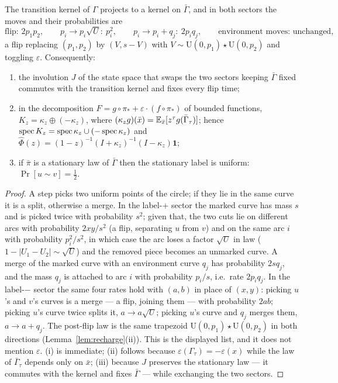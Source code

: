 \begin{lemma}\label{lem:autonomy}
The transition kernel of $\Gamma$ projects to a kernel on
$\bar\Gamma$, and in both sectors the moves and their probabilities are
\[
\text{flip: }2p_1p_2,\qquad
p_i\to p_i\sqrt U:\ p_i^2,\qquad
p_i\to p_i+q_j:\ 2p_iq_j,\qquad
\text{environment moves: unchanged,}
\]
a flip replacing $(p_1,p_2)$ by $(V,s-V)$ with
$V\sim\mathrm{U}(0,p_1)\star\mathrm{U}(0,p_2)$ and toggling
$\varepsilon$.  Consequently:
\begin{enumerate}[leftmargin=2em]
\item[(i)] the involution $J$ of the state space that swaps the two
sectors keeping $\bar\Gamma$ fixed commutes with the transition kernel
and fixes every flip time;
\item[(ii)] in the decomposition
$F=g\circ\pi_\ast+\varepsilon\cdot(f\circ\pi_\ast)$ of bounded
functions, $K_z=\kappa_z\oplus(-\kappa_z)$, where
$(\kappa_zg)(\bar x)=\mathbb{E}_{\bar x}[z^\tau g(\bar\Gamma_\tau)]$; hence
$\operatorname{spec} K_z=\operatorname{spec}\kappa_z\cup(-\operatorname{spec}\kappa_z)$ and
$\widehat\Phi(z)=(1-z)^{-1}(I+\kappa_z)^{-1}(I-\kappa_z)\mathbf 1$;
\item[(iii)] if $\bar\pi$ is a stationary law of $\bar\Gamma$ then the
stationary label is uniform: $\Pr[u\sim v]=\tfrac12$.
\end{enumerate}
\end{lemma}

\begin{proof}
A step picks two uniform points of the circle; if they lie in the same
curve it is a split, otherwise a merge.  In the label-$+$ sector the
marked curve has mass $s$ and is picked twice with probability $s^2$;
given that, the two cuts lie on different arcs with probability
$2xy/s^2$ (a flip, separating $u$ from $v$) and on the same arc $i$
with probability $p_i^2/s^2$, in which case the arc loses a factor
$\sqrt U$ in law ($1-|U_1-U_2|\sim\sqrt U$) and the removed piece
becomes an unmarked curve.  A merge of the marked curve with an
environment curve $q_j$ has probability $2sq_j$, and the mass $q_j$ is
attached to arc $i$ with probability $p_i/s$, i.e.\ rate $2p_iq_j$.  In
the label-$-$ sector the same four rates hold with $(a,b)$ in place of
$(x,y)$: picking $u$'s and $v$'s curves is a merge --- a flip, joining
them --- with probability $2ab$; picking $u$'s curve twice splits it,
$a\to a\sqrt U$; picking $u$'s curve and $q_j$ merges them,
$a\to a+q_j$.  The post-flip law is the same trapezoid
$\mathrm{U}(0,p_1)\star\mathrm{U}(0,p_2)$ in both directions
(Lemma~\ref{lem:recharge}(ii)).  This is the displayed list, and it
does not mention $\varepsilon$.  (i) is immediate; (ii) follows because
$\varepsilon(\Gamma_\tau)=-\varepsilon(x)$ while the law of
$\bar\Gamma_\tau$ depends only on $\bar x$; (iii) because $J$ preserves
the stationary law --- it commutes with the kernel and fixes
$\bar\Gamma$ --- while exchanging the two sectors.
\end{proof}

